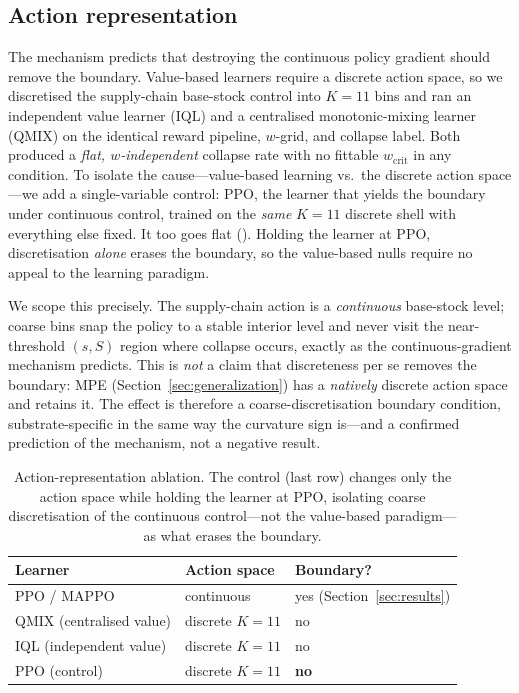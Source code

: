 \documentclass[letterpaper]{article}
\theoremstyle{plain}
\newcommand{\wcrit}{w_{\mathrm{crit}}}
\begin{document}
\subsection{Action representation}
\label{sec:ablation_action}
The mechanism predicts that destroying the continuous policy gradient should
remove the boundary. Value-based learners require a discrete action space, so we
discretised the supply-chain base-stock control into $K{=}11$ bins and ran an
independent value learner (IQL) and a centralised monotonic-mixing learner
(QMIX) on the identical reward pipeline, $w$-grid, and collapse label. Both
produced a \emph{flat, $w$-independent} collapse rate with no fittable $\wcrit$
in any condition. To isolate the cause---value-based learning vs.\ the discrete
action space---we add a single-variable control: PPO, the learner that yields
the boundary under continuous control, trained on the \emph{same} $K{=}11$
discrete shell with everything else fixed. It too goes flat
(). Holding the learner at PPO, discretisation
\emph{alone} erases the boundary, so the value-based nulls require no appeal to
the learning paradigm.

We scope this precisely. The supply-chain action is a \emph{continuous}
base-stock level; coarse bins snap the policy to a stable interior level and
never visit the near-threshold $(s,S)$ region where collapse occurs, exactly as
the continuous-gradient mechanism predicts. This is \emph{not} a claim that
discreteness per se removes the boundary: MPE (Section~\ref{sec:generalization}) has a
\emph{natively} discrete action space and retains it. The effect is therefore a
coarse-discretisation boundary condition, substrate-specific in the same way the
curvature sign is---and a confirmed prediction of the mechanism, not a negative
result.

\begin{table}[t]
\centering \small
\begin{tabular}{lll}
\toprule
Learner & Action space & Boundary? \\
\midrule
PPO / MAPPO              & continuous        & yes (Section~\ref{sec:results}) \\
QMIX (centralised value) & discrete $K{=}11$ & no \\
IQL (independent value)  & discrete $K{=}11$ & no \\
PPO (control)            & discrete $K{=}11$ & \textbf{no} \\
\bottomrule
\end{tabular}
\caption{Action-representation ablation. The control (last row) changes only the
action space while holding the learner at PPO, isolating coarse discretisation of
the continuous control---not the value-based paradigm---as what erases the
boundary.}
\label{tab:ablation_action}
\end{table}
\end{document}
